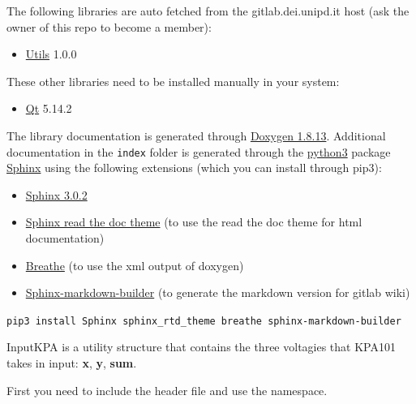 
The following libraries are auto fetched from the gitlab.dei.unipd.it
host (ask the owner of this repo to become a member):

\begin{itemize}
  \tightlist
  \item
        \href{https://gitlab.dei.unipd.it/PAT/Utils.git}{Utils} 1.0.0
\end{itemize}

These other libraries need to be installed manually in your system:

\begin{itemize}
  \tightlist
  \item
        \href{https://www.qt.io/}{Qt} 5.14.2
\end{itemize}

The library documentation is generated through
\href{http://www.doxygen.nl/download.html}{Doxygen 1.8.13}. Additional
documentation in the \texttt{index} folder is generated through the
\href{https://www.anaconda.com/products/individual}{python3} package
\href{https://www.sphinx-doc.org/en/master/}{Sphinx} using the following
extensions (which you can install through pip3):

\begin{itemize}
  \tightlist
  \item
        \href{https://pypi.org/project/Sphinx/}{Sphinx 3.0.2}
  \item
        \href{https://sphinx-rtd-theme.readthedocs.io/en/stable/}{Sphinx read
          the doc theme} (to use the read the doc theme for html documentation)
  \item
        \href{https://pypi.org/project/breathe/}{Breathe} (to use the xml
        output of doxygen)
  \item
        \href{https://pypi.org/project/sphinx-markdown-builder/}{Sphinx-markdown-builder}
        (to generate the markdown version for gitlab wiki)
\end{itemize}

\texttt{pip3\ install\ Sphinx\ sphinx\_rtd\_theme\ breathe\ sphinx-markdown-builder}



InputKPA is a utility structure that contains the three voltagies that
KPA101 takes in input: \textbf{x}, \textbf{y}, \textbf{sum}.

First you need to include the header file and use the namespace.

